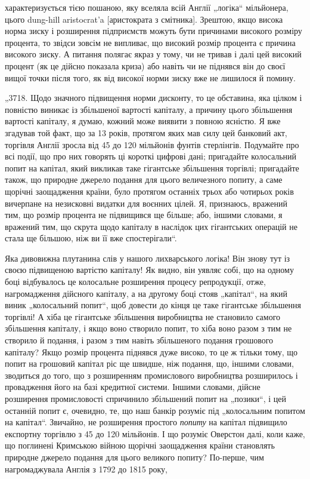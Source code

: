\parcont{}  %
характеризується тією пошаною, яку вселяла всій Англії „логіка“
мільйонера, цього dung-hill aristocrat’a [аристократа з смітника].
Зрештою, якщо висока норма зиску і розширення підприємств
можуть бути причинами високого розміру процента, то звідси
зовсім не випливає, що високий розмір процента є причина високого зиску. А питання полягає якраз у
тому, чи не тривав і далі
цей високий процент (як це дійсно показала криза) або навіть чи не піднявся він до своєї вищої точки
після того, як від
високої норми зиску вже не лишилося й помину.

„3718. Щодо значного підвищення норми дисконту, то це
обставина, яка цілком і повністю виникає із збільшеної вартості капіталу, а причину цього збільшення
вартості капіталу, я думаю, кожний може виявити з повною ясністю. Я вже згадував
той факт, що за 13 років, протягом яких мав силу цей банковий акт, торгівля Англії зросла від 45 до
120 мільйонів фунтів
стерлінгів. Подумайте про всі події, що про них говорять ці короткі цифрові дані; пригадайте
колосальний попит на капітал,
який викликав таке гігантське збільшення торгівлі; пригадайте
також, що природне джерело подання для цього величезного попиту, а саме щорічні заощадження країни,
було протягом останніх трьох або чотирьох років вичерпане на незисковні видатки
для воєнних цілей. Я, признаюсь, вражений тим, що розмір процента не підвищився ще більше; або,
іншими словами, я вражений тим, що скрута щодо капіталу в наслідок цих гігантських
операцій не стала ще більшою, ніж ви її вже спостерігали“.

Яка дивовижна плутанина слів у нашого лихварського логіка!
Він знову тут із своєю підвищеною вартістю капіталу! Як видно,
він уявляє собі, що на одному боці відбувалось це колосальне
розширення процесу репродукції, отже, нагромадження дійсного
капіталу, а на другому боці стояв „капітал“, на який виник
„колосальний попит“, щоб довести до кінця це таке гігантське
збільшення торгівлі! А хіба це гігантське збільшення виробництва
не становило самого збільшення капіталу, і якщо воно створило
попит, то хіба воно разом з тим не створило й подання, і разом
з тим навіть збільшеного подання грошового капіталу? Якщо
розмір процента піднявся дуже високо, то це ж тільки тому,
що попит на грошовий капітал ріс ще швидше, ніж подання,
що, іншими словами, зводиться до того, що з розширенням промислового виробництва розширилось і
провадження його на
базі кредитної системи. Іншими словами, дійсне розширення
промисловості спричинило збільшений попит на „позики“, і цей
останній попит є, очевидно, те, що наш банкір розуміє під „колосальним попитом на капітал“.
Звичайно, не розширення простого \emph{попиту} на капітал підвищило експортну торгівлю з 45 до
120 мільйонів. І що розуміє Оверстон далі, коли каже, що
поглинені Кримською війною щорічні заощадження країни становлять природне джерело подання для цього
великого попиту? По-перше, чим нагромаджувала Англія з 1792 до 1815 року,
\parbreak{}  %
